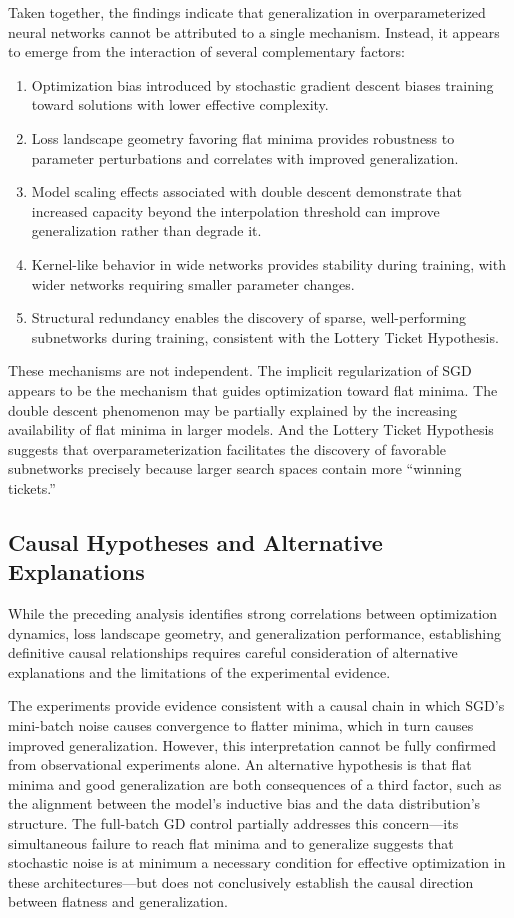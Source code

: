 \documentclass[conference]{IEEEtran}
\begin{document}
Taken together, the findings indicate that generalization in overparameterized neural networks cannot be attributed to a single mechanism. Instead, it appears to emerge from the interaction of several complementary factors:
\begin{enumerate}
    \item Optimization bias introduced by stochastic gradient descent biases training toward solutions with lower effective complexity.
    \item Loss landscape geometry favoring flat minima provides robustness to parameter perturbations and correlates with improved generalization.
    \item Model scaling effects associated with double descent demonstrate that increased capacity beyond the interpolation threshold can improve generalization rather than degrade it.
    \item Kernel-like behavior in wide networks provides stability during training, with wider networks requiring smaller parameter changes.
    \item Structural redundancy enables the discovery of sparse, well-performing subnetworks during training, consistent with the Lottery Ticket Hypothesis.
\end{enumerate}

These mechanisms are not independent. The implicit regularization of SGD appears to be the mechanism that guides optimization toward flat minima. The double descent phenomenon may be partially explained by the increasing availability of flat minima in larger models. And the Lottery Ticket Hypothesis suggests that overparameterization facilitates the discovery of favorable subnetworks precisely because larger search spaces contain more ``winning tickets.''

\subsection{Causal Hypotheses and Alternative Explanations}

While the preceding analysis identifies strong correlations between optimization dynamics, loss landscape geometry, and generalization performance, establishing definitive causal relationships requires careful consideration of alternative explanations and the limitations of the experimental evidence.

The experiments provide evidence consistent with a causal chain in which SGD's mini-batch noise causes convergence to flatter minima, which in turn causes improved generalization. However, this interpretation cannot be fully confirmed from observational experiments alone. An alternative hypothesis is that flat minima and good generalization are both consequences of a third factor, such as the alignment between the model's inductive bias and the data distribution's structure. The full-batch GD control partially addresses this concern---its simultaneous failure to reach flat minima and to generalize suggests that stochastic noise is at minimum a necessary condition for effective optimization in these architectures---but does not conclusively establish the causal direction between flatness and generalization.
\end{document}
